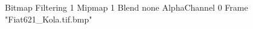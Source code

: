 {Bitmap
	{Filtering 1}
	{Mipmap 1}
	{Blend none}
	{AlphaChannel 0}
	{Frame "Fiat621_Kola.tif.bmp"}
}
